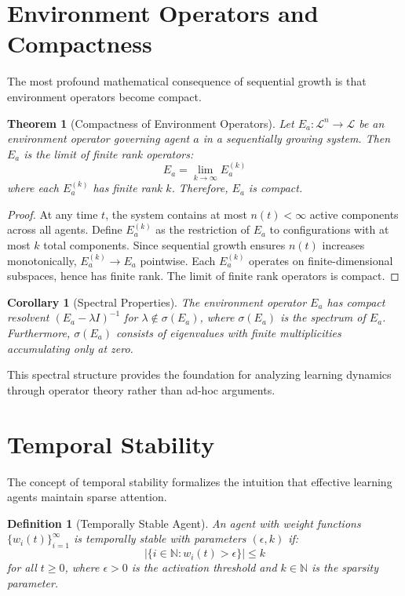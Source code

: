 \documentclass[11pt]{article}
\newtheorem{theorem}{Theorem}
\newtheorem{corollary}{Corollary}
\newtheorem{definition}{Definition}
\begin{document}
\section{Environment Operators and Compactness}

The most profound mathematical consequence of sequential growth is that environment operators become compact.

\begin{theorem}[Compactness of Environment Operators]
Let $E_a: \mathcal{L}^n \to \mathcal{L}$ be an environment operator governing agent $a$ in a sequentially growing system. Then $E_a$ is the limit of finite rank operators:
\begin{equation}
E_a = \lim_{k \to \infty} E_a^{(k)}
\end{equation}
where each $E_a^{(k)}$ has finite rank $k$. Therefore, $E_a$ is compact.
\end{theorem}

\begin{proof}
At any time $t$, the system contains at most $n(t) < \infty$ active components across all agents. Define $E_a^{(k)}$ as the restriction of $E_a$ to configurations with at most $k$ total components. Since sequential growth ensures $n(t)$ increases monotonically, $E_a^{(k)} \to E_a$ pointwise. Each $E_a^{(k)}$ operates on finite-dimensional subspaces, hence has finite rank. The limit of finite rank operators is compact.
\end{proof}

\begin{corollary}[Spectral Properties]
The environment operator $E_a$ has compact resolvent $(E_a - \lambda I)^{-1}$ for $\lambda \notin \sigma(E_a)$, where $\sigma(E_a)$ is the spectrum of $E_a$. Furthermore, $\sigma(E_a)$ consists of eigenvalues with finite multiplicities accumulating only at zero.
\end{corollary}

This spectral structure provides the foundation for analyzing learning dynamics through operator theory rather than ad-hoc arguments.

\section{Temporal Stability}

The concept of temporal stability formalizes the intuition that effective learning agents maintain sparse attention.

\begin{definition}[Temporally Stable Agent]
An agent with weight functions $\{w_i(t)\}_{i=1}^{\infty}$ is temporally stable with parameters $(\epsilon, k)$ if:
\begin{equation}
|\{i \in \mathbb{N} : w_i(t) > \epsilon\}| \leq k
\end{equation}
for all $t \geq 0$, where $\epsilon > 0$ is the activation threshold and $k \in \mathbb{N}$ is the sparsity parameter.
\end{definition}
\end{document}
